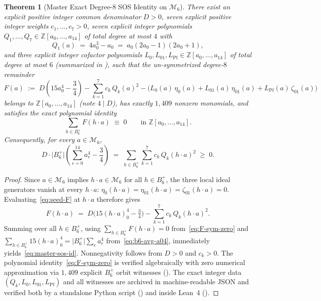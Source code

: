 \documentclass[11pt,a4paper]{article}
\theoremstyle{plain}
\newtheorem{theorem}{Theorem}[section]
\theoremstyle{definition}
\theoremstyle{remark}
\newcommand{\Z}{\mathbb{Z}}
\newcommand{\Mman}{\mathcal{M}_6}
\newcommand{\Bplus}{B_6^+}
\begin{document}
\begin{theorem}[Master Exact Degree-8 SOS Identity on $\Mman$]
\label{thm:master-sos}
There exist an explicit positive integer common denominator $D > 0$, seven explicit positive integer weights $c_1, \dots, c_7 > 0$, seven explicit integer polynomials $Q_1, \dots, Q_7 \in \Z[a_0,\dots,a_{14}]$ of total degree at most $4$ with
\begin{equation}
  \label{eq:q1-def}
  Q_1(a) \;=\; 4 a_0^3 - a_0 \;=\; a_0(2a_0 - 1)(2a_0 + 1),
\end{equation}
and three explicit integer cofactor polynomials $L_0, L_{01}, L_{\mathrm{Pf}} \in \Z[a_0,\dots,a_{14}]$ of total degree at most $6$ (summarized in ), such that the un-symmetrized degree-$8$ remainder
\begin{equation}
  \label{eq:seed-F}
  F(a) \;:=\; D\!\left(15 a_0^4 - \frac{3}{4}\right) - \sum_{k=1}^{7} c_k\, Q_k(a)^2 - \bigl(L_0(a)\,\eta_0(a) + L_{01}(a)\,\eta_{01}(a) + L_{\mathrm{Pf}}(a)\,\zeta_{01}(a)\bigr)
\end{equation}
belongs to $\Z[a_0,\dots,a_{14}]$ (note $4 \mid D$), has exactly $1{,}409$ nonzero monomials, and satisfies the exact polynomial identity
\begin{equation}
  \label{eq:F-sym-zero}
  \sum_{h \in \Bplus} F(h \cdot a) \;\equiv\; 0 \qquad \text{in } \Z[a_0,\dots,a_{14}].
\end{equation}
Consequently, for every $a \in \Mman$,
\begin{equation}
  \label{eq:master-sos-id}
  D \cdot \lvert\Bplus\rvert \left(\sum_{e=0}^{14} a_e^4 - \frac{3}{4}\right)
  \;=\; \sum_{h \in \Bplus} \sum_{k=1}^{7} c_k\, Q_k(h \cdot a)^2 \;\ge\; 0.
\end{equation}
\end{theorem}

\begin{proof}
Since $a \in \Mman$ implies $h \cdot a \in \Mman$ for all $h \in \Bplus$, the three local ideal generators vanish at every $h \cdot a$: $\eta_0(h\cdot a) = \eta_{01}(h\cdot a) = \zeta_{01}(h\cdot a) = 0$. Evaluating~\eqref{eq:seed-F} at $h \cdot a$ therefore gives
\[
  F(h \cdot a) \;=\; D\bigl(15(h\cdot a)_0^4 - \tfrac{3}{4}\bigr) - \sum_{k=1}^7 c_k\, Q_k(h\cdot a)^2.
\]
Summing over all $h \in \Bplus$, using $\sum_{h\in\Bplus} F(h\cdot a) = 0$ from~\eqref{eq:F-sym-zero} and $\sum_{h\in\Bplus} 15(h\cdot a)_0^4 = \lvert\Bplus\rvert \sum_e a_e^4$ from~\eqref{eq:b6-avg-a04}, immediately yields~\eqref{eq:master-sos-id}. Nonnegativity follows from $D > 0$ and $c_k > 0$. The polynomial identity~\eqref{eq:F-sym-zero} is verified algebraically with zero numerical approximation via $1{,}409$ explicit $\Bplus$ orbit witnesses (). The exact integer data $(Q_k, L_0, L_{01}, L_{\mathrm{Pf}})$ and all witnesses are archived in machine-readable JSON and verified both by a standalone Python script () and inside Lean~4 ().
\end{proof}
\end{document}
